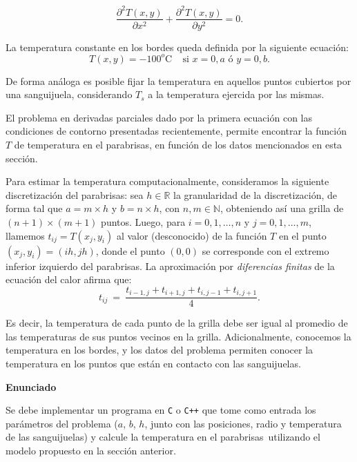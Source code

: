\documentclass[11pt, a4paper]{article}
\newcommand{\atacante}{sanguijuela}
\newcommand{\objeto}{parabrisas}
\begin{document}
\begin{equation}\label{eq:calor}
\frac{\partial^2T(x,y)}{\partial x^{2}}+\frac{\partial^2 T(x,y)}{\partial y^{2}} = 0.
\end{equation}

\noindent La temperatura constante en los bordes queda definida por la siguiente ecuaci\'on:
\begin{equation}
T(x,y) = -100^o\textrm{C}~~~~~\textrm{si } x = 0,a \textrm{ \'o } y = 0,b.
\label{eq:borde}
\end{equation}

\noindent De forma an\'aloga es posible fijar la temperatura en aquellos puntos cubiertos por una \atacante, considerando $T_s$ a la temperatura ejercida por las mismas.

El problema en derivadas parciales dado por la primera ecuaci\'on con las condiciones de contorno presentadas recientemente, permite encontrar la funci\'on $T$ de temperatura en el \objeto, en funci\'on de los datos mencionados en esta secci\'on.

Para estimar la temperatura computacionalmente, con\-si\-de\-ra\-mos la siguiente discretizaci\'on del \objeto: sea $h \in \mathbb{R}$ la granularidad de la discretizaci\'on, de forma tal que $a = m\times h$ y $b = n \times h$, con $n,m \in \mathbb{N}$, obteniendo as\'i una grilla de $(n+1)\times(m+1)$ puntos. Luego, para $i=0,1,\dots,n$ y $j=0,1,\dots,m$, llamemos $t_{ij} = T(x_j,y_i)$ al valor (desconocido) de la funci\'on $T$ en el punto $(x_j, y_i) = (ih, jh)$, donde el punto $(0,0)$ se corresponde con el extremo inferior izquierdo del \objeto.
La aproximaci\'on por \emph{diferencias finitas} de la ecuaci\'on del calor afirma que:
\begin{equation}
t_{ij} \ =\ \frac{ t_{i-1,j} + t_{i+1,j} + t_{i,j-1} + t_{i,j+1}}{4}.\label{eq:calordd}
\end{equation}

Es decir, la temperatura de cada punto de la grilla debe ser igual al promedio de las tem\-pe\-ra\-tu\-ras de sus puntos vecinos en la grilla. Adicionalmente, conocemos la temperatura en los bordes, y los datos del problema permiten conocer la temperatura en los puntos que est\'an en contacto con las \atacante s.

{\noindent \bf Enunciado}

Se debe implementar un programa en \verb+C+ o \verb-C++- que tome como entrada los par\'ametros del problema ($a$, $b$, $h$, junto con las posiciones, radio y temperatura de las \atacante s) y calcule la temperatura en el \objeto\ utilizando el modelo propuesto en la secci\'on anterior.
\end{document}
